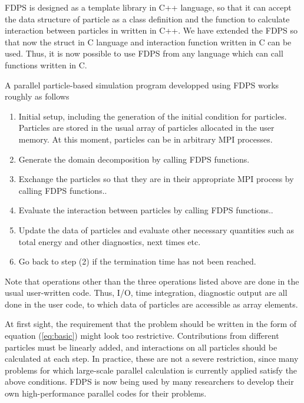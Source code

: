 FDPS is designed as a template library in C++ language, so that
it can accept the data structure of particle as a class definition 
and the function to calculate interaction between particles in written
in C++. We have extended the FDPS so that now the struct in C language
and interaction function written in C can be used. Thus, it is now
possible to use FDPS from any language which can call functions
written in C.

A parallel particle-based simulation program developped using FDPS works roughly as follows

\begin{enumerate}

\item Initial setup, including the generation of the initial condition
  for particles. Particles are stored in the usual array of particles
  allocated in the user memory. At this moment, particles can be in
  arbitrary MPI processes. 
\item Generate the domain decomposition by calling FDPS functions.
\item Exchange the particles so that they are in their appropriate MPI
  process by calling FDPS functions..  
\item Evaluate the interaction between particles by calling FDPS
  functions..
\item Update the data of particles and evaluate other necessary quantities such
  as total energy and  other diagnostics, next times etc.
\item Go back to step (2) if the termination time has not been reached.
  \end{enumerate}

Note that operations other than the three operations listed above are
done in the usual user-written code. Thus, I/O, time integration,
diagnostic output are all done in the user code, to which 
data of particles are accessible as  array elements.


At first sight, 
the requirement that the problem should be written in the form of
equation (\ref{eq:basic}) might look too restrictive. Contributions
from different particles must be linearly added, and interactions on
all particles should be calculated at each step.
In practice, these are not a severe restriction, since  many problems
for which large-scale parallel calculation is currently applied
satisfy the above conditions. FDPS is now being used by many
researchers to develop their own high-performance parallel codes for
their problems. 

